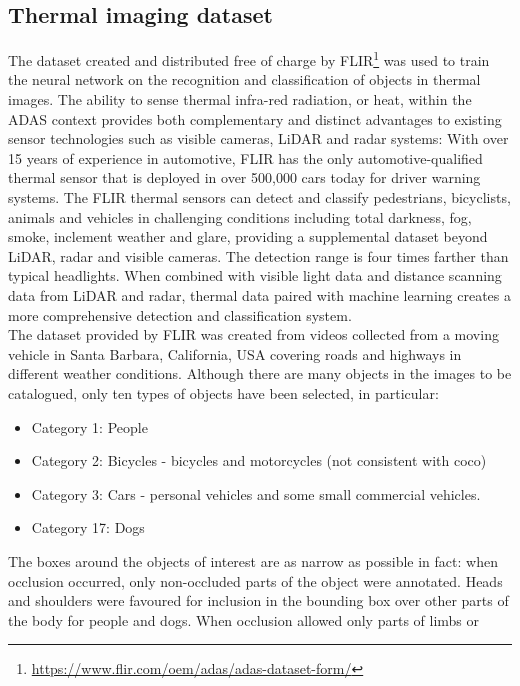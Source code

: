 \subsection{Thermal imaging dataset}
\label{ssec:thermal-image-dataset}
The dataset created and distributed free of charge by
FLIR\footnote{\href{https://www.flir.com/oem/adas/adas-dataset-form/}{https://www.flir.com/oem/adas/adas-dataset-form/}}
was used to train the neural network on the recognition and classification of
objects in thermal images. The ability to sense thermal infra-red radiation, or
heat, within the ADAS context provides both complementary and distinct
advantages to existing sensor technologies such as visible cameras, LiDAR and
radar systems: With over 15 years of experience in automotive, FLIR has the only
automotive-qualified thermal sensor that is deployed in over 500,000 cars today
for driver warning systems. The FLIR thermal sensors can detect and classify
pedestrians, bicyclists, animals and vehicles in challenging conditions
including total darkness, fog, smoke, inclement weather and glare, providing a
supplemental dataset beyond LiDAR, radar and visible cameras. The detection
range is four times farther than typical headlights. When combined with visible
light data and distance scanning data from LiDAR and radar, thermal data paired
with machine learning creates a more comprehensive detection and classification
system.\cite{flirdataset}\hfill\break
\\The dataset provided by FLIR was created from videos collected from a moving
vehicle in Santa Barbara, California, USA covering roads and highways in
different weather conditions. Although there are many objects in the images to
be catalogued, only ten types of objects have been selected, in particular:
\begin{itemize}
\item Category 1: People
\item Category 2: Bicycles - bicycles and motorcycles (not consistent with coco)
\item Category 3: Cars - personal vehicles and some small commercial vehicles.
\item Category 17: Dogs
\end{itemize}
%
The boxes around the objects of interest are as narrow as possible in fact: when
occlusion occurred, only non-occluded parts of the object were annotated. Heads
and shoulders were favoured for inclusion in the bounding box over other parts of
the body for people and dogs. When occlusion allowed only parts of limbs or
